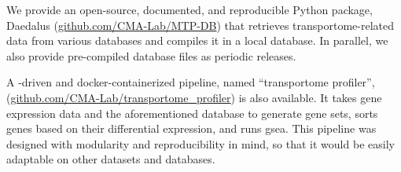 We provide an open-source, documented, and reproducible Python package, Daedalus (\href{https://github.com/CMA-Lab/MTP-DB}{github.com/CMA-Lab/MTP-DB}) that retrieves transportome-related data from various databases and compiles it in a local  database.
In parallel, we also provide pre-compiled database files as periodic releases.

A -driven and docker-containerized pipeline, named ``transportome profiler'', (\href{https://github.com/CMA-Lab/transportome_profiler}{github.com/CMA-Lab/transportome\_profiler}) is also available.
It takes gene expression data and the aforementioned database to generate gene sets, sorts genes based on their differential expression, and runs \gls{gsea}.
This pipeline was designed with modularity and reproducibility in mind, so that it would be easily adaptable on other datasets and databases.

